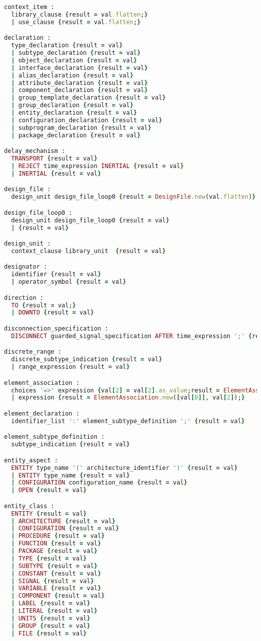 \begin{lstlisting}[language=Ruby, style=rubystyle]
context_item :
  library_clause {result = val.flatten;}
  | use_clause {result = val.flatten;}

declaration :
  type_declaration {result = val}
  | subtype_declaration {result = val}
  | object_declaration {result = val}
  | interface_declaration {result = val}
  | alias_declaration {result = val}
  | attribute_declaration {result = val}
  | component_declaration {result = val}
  | group_template_declaration {result = val}
  | group_declaration {result = val}
  | entity_declaration {result = val}
  | configuration_declaration {result = val}
  | subprogram_declaration {result = val}
  | package_declaration {result = val}

delay_mechanism :
  TRANSPORT {result = val}
  | REJECT time_expression INERTIAL {result = val}
  | INERTIAL {result = val}

design_file :
  design_unit design_file_loop0 {result = DesignFile.new(val.flatten)}

design_file_loop0 :
  design_unit design_file_loop0 {result = val}
  | {result = val}

design_unit :
  context_clause library_unit  {result = val}

designator :
  identifier {result = val}
  | operator_symbol {result = val}

direction :
  TO {result = val;}
  | DOWNTO {result = val}

disconnection_specification :
  DISCONNECT guarded_signal_specification AFTER time_expression ';' {result = val}

discrete_range :
  discrete_subtype_indication {result = val}
  | range_expression {result = val}

element_association :
  choices '=>' expression {val[2] = val[2].as_value;result = ElementAssociation.new(val[0], val[2]);}
  | expression {result = ElementAssociation.new([val[0]], val[2]);}

element_declaration :
  identifier_list ':' element_subtype_definition ';' {result = val}

element_subtype_definition :
  subtype_indication {result = val}

entity_aspect :
  ENTITY type_name '(' architecture_identifier ')' {result = val}
  | ENTITY type_name {result = val}
  | CONFIGURATION configuration_name {result = val}
  | OPEN {result = val}

entity_class :
  ENTITY {result = val}
  | ARCHITECTURE {result = val}
  | CONFIGURATION {result = val}
  | PROCEDURE {result = val}
  | FUNCTION {result = val}
  | PACKAGE {result = val}
  | TYPE {result = val}
  | SUBTYPE {result = val}
  | CONSTANT {result = val}
  | SIGNAL {result = val}
  | VARIABLE {result = val}
  | COMPONENT {result = val}
  | LABEL {result = val}
  | LITERAL {result = val}
  | UNITS {result = val}
  | GROUP {result = val}
  | FILE {result = val}


\end{lstlisting}
